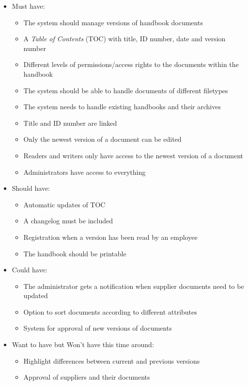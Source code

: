 \begin{itemize}
        \item Must have:
        \begin{itemize}
                \item The system should manage versions of handbook documents
                \item A \textit{Table of Contents} (TOC) with title, ID number, date and version number
                \item Different levels of permissions/access rights to the documents within the handbook
                \item The system should be able to handle documents of different filetypes
                \item The system needs to handle existing handbooks and their archives
                \item Title and ID number are linked
                \item Only the newest version of a document can be edited
                \item Readers and writers only have access to the newest version of a document
                \item Administrators have access to everything
        \end{itemize}
        \item Should have:
        \begin{itemize}
                \item Automatic updates of TOC
                \item A changelog must be included
                \item Registration when a version has been read by an employee
                \item The handbook should be printable
        \end{itemize}
        \item Could have:
        \begin{itemize}
                \item The administrator gets a notification when supplier documents need to be updated
                \item Option to sort documents according to different attributes
                \item System for approval of new versions of documents
        \end{itemize}
        \item Want to have but Won't have this time around:
        \begin{itemize}
                \item Highlight differences between current and previous versions
                \item Approval of suppliers and their documents
        \end{itemize}
\end{itemize}